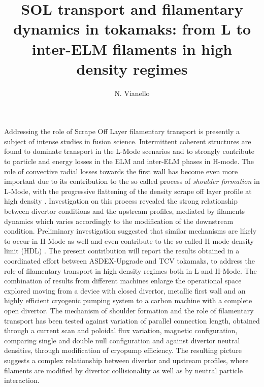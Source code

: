 \documentclass{epsconf}
\title{SOL transport and filamentary dynamics in tokamaks: from L to
  inter-ELM filaments in high density regimes}
\author{N. Vianello}
\institute{Consorzio RFX (CNR, ENEA, INFN, Universit{\'a} di Padova, Acciaierie Venete SpA), C.so Stati Uniti 4, 35127, Padova, Italy}
\begin{document}
\maketitle
Addressing the role of Scrape Off Layer filamentary transport is
presently a subject of intense studies in fusion science. 
Intermittent coherent structures are found to dominate transport in
the L-Mode scenarios and to strongly contribute to particle
and energy losses in the ELM and inter-ELM phases in H-mode.
The role of convective radial losses towards the first
wall has become even more important due to its 
contribution 
to the so called process of \emph{shoulder formation} in
L-Mode, with the progressive flattening of the density
scrape off layer profile at high density
\cite{LaBombard:2001ks,Carralero:2015gu,Militello:2016hk,Vianello:2017ku}.
Investigation on this process revealed the strong
relationship between divertor conditions and the upstream profiles,
mediated by filaments dynamics which varies
accordingly to the modification of the downstream condition.
Preliminary investigation suggested that similar mechanisms are likely to
occur in H-Mode as well \cite{Carralero:2017gb} and even contribute to
the so-called H-mode density limit (HDL) \cite{bernert2014h}.  
The present contribution will report the results obtained in a
coordinated effort between ASDEX-Upgrade and TCV tokamaks, to address
the role of filamentary transport in high density regimes both in L
and H-Mode. The combination 
of results from different machines enlarge the operational
space explored moving from a device with closed divertor,  metallic
first wall and an highly efficient cryogenic pumping system to a carbon
machine with a complete open divertor.
The mechanism of shoulder formation and the role of filamentary
transport has been tested against variation of parallel connection
length, obtained through a current scan and poloidal flux variation,
magnetic configuration, comparing single and double null configuration
and against divertor neutral densities, through modification of
cryopump efficiency. The resulting picture suggests a complex
relationship between divertor and upstream profiles, where filaments
are modified by divertor collisionality as well as by neutral particle
interaction.
 
\begingroup
{}
\printbibliography
\endgroup
\end{document}
